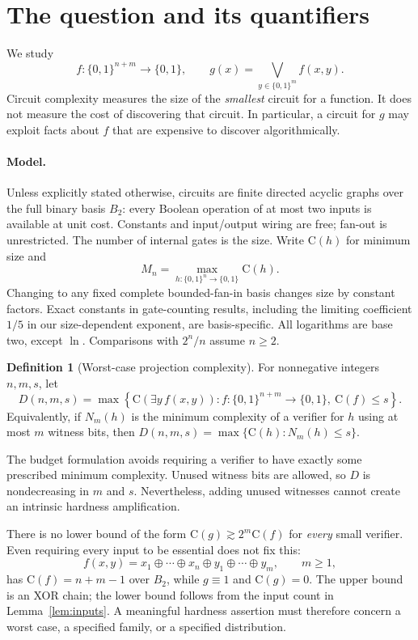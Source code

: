 \documentclass[11pt]{article}
\theoremstyle{definition}
\newtheorem{definition}[theorem]{Definition}
\theoremstyle{remark}
\newcommand{\B}{\{0,1\}}
\newcommand{\C}{\mathrm{C}}
\newcommand{\OR}{\bigvee}
\begin{document}




\section{The question and its quantifiers}

We study
\[
 f:\B^{n+m}\longrightarrow\B,
 \qquad
 g(x)=\OR_{y\in\B^m}f(x,y).
\]
Circuit complexity measures the size of the \emph{smallest} circuit for
a function. It does not measure the cost of discovering that circuit.
In particular, a circuit for $g$ may exploit facts about $f$ that are
expensive to discover algorithmically.

\paragraph{Model.}
Unless explicitly stated otherwise, circuits are finite directed acyclic
graphs over the full binary basis $B_2$: every Boolean operation of at
most two inputs is available at unit cost. Constants and input/output
wiring are free; fan-out is unrestricted. The number of internal gates
is the size. Write $\C(h)$ for minimum size and
\[
 M_n=\max_{h:\B^n\to\B}\C(h).
\]
Changing to any fixed complete bounded-fan-in basis changes size by
constant factors. Exact constants in gate-counting results, including
the limiting coefficient $1/5$ in our size-dependent exponent, are basis-specific.
All logarithms are base two, except $\ln$. Comparisons with $2^n/n$
assume $n\ge2$.

\begin{definition}[Worst-case projection complexity]
For nonnegative integers $n,m,s$, let
\[
 D(n,m,s)=\max\left\{\C(\exists y\,f(x,y)):
                 f:\B^{n+m}\to\B,\ \C(f)\le s\right\}.
\]
Equivalently, if $N_m(h)$ is the minimum complexity of a verifier for
$h$ using at most $m$ witness bits, then
$D(n,m,s)=\max\{\C(h):N_m(h)\le s\}$.
\end{definition}

The budget formulation avoids requiring a verifier to have exactly
some prescribed minimum complexity. Unused witness bits are allowed,
so $D$ is nondecreasing in $m$ and $s$. Nevertheless, adding unused
witnesses cannot create an intrinsic hardness amplification.

There is no lower bound of the form $\C(g)\gtrsim2^m\C(f)$ for
\emph{every} small verifier. Even requiring every input to be essential
does not fix this:
\[
 f(x,y)=x_1\oplus\cdots\oplus x_n\oplus y_1\oplus\cdots\oplus y_m,
 \qquad m\ge1,
\]
has $\C(f)=n+m-1$ over $B_2$, while $g\equiv1$ and $\C(g)=0$.
The upper bound is an XOR chain; the lower bound follows from the input
count in Lemma~\ref{lem:inputs}. A meaningful hardness assertion must
therefore concern a worst case, a specified family, or a specified
distribution.
\end{document}
